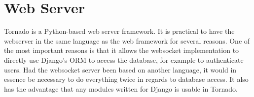 \section{Web Server}
Tornado\cite{tornadoweb11} is a Python-based web server framework. 
It is practical to have the webserver in the same language as the web framework 
for several reasons. One of the most important reasons is that it allows the 
websocket implementation to directly use Django's ORM to access the database, 
for example to authenticate users. Had the websocket server been based on 
another language, it would in essence be necessary to do everything twice in regards to database access. It also has the advantage that any modules written for Django is 
usable in Tornado.